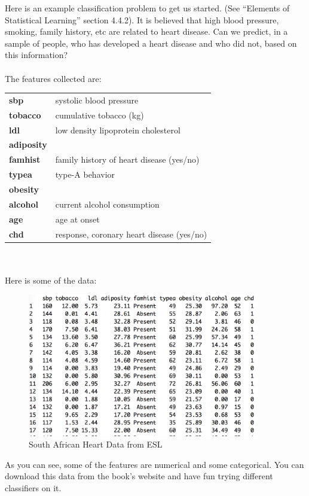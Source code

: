   Here is an example classification problem to get us started.
  (See ``Elements of Statistical Learning'' section 4.4.2). It is believed that
  high blood pressure, smoking, family history, etc are related to heart
  disease. Can we predict, in a sample of people, who has developed a heart
  disease and who did not, based on this information? 
\\~\\
The features collected are:
\begin{table}[h!]
    \centering
    \begin{tabular}{l l}
      {\bf 	sbp	} & systolic blood pressure\\
      {\bf 	tobacco	} & cumulative tobacco (kg)\\
      {\bf 	ldl	} &low density lipoprotein cholesterol\\
      {\bf 	adiposity	} & \\
      {\bf 	famhist	} & family history of heart disease (yes/no)\\
      {\bf 	typea	} & type-A behavior\\
      {\bf 	obesity	} & \\
      {\bf 	alcohol	} & current alcohol consumption\\
      {\bf 	age	} & age at onset\\
      {\bf 	chd	} & response, coronary heart disease (yes/no)\\
    \end{tabular}
  \end{table}
\\~\\ Here is some of the data:
\begin{figure}[h!]
      \centering
      \includegraphics[width=4in]{SAheart_data}
      \caption{South African Heart Data from ESL}
    \end{figure}

    As you can see, some of the features are numerical and some categorical. You can
download this data from the book's website and have fun trying different
classifiers on  it.


